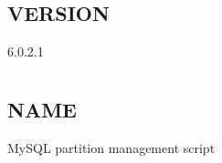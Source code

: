 \documentclass[letterpaper,10pt,english]{sphinxmanual}
\begin{document}
\section{VERSION}
\label{\detokenize{mariadb-kill:version}}
 6.0.2.1


\chapter{}
\label{\detokenize{mariadb-parted:mariadb-parted}}\label{\detokenize{mariadb-parted::doc}}

\section{NAME}
\label{\detokenize{mariadb-parted:name}}
 \sphinxhyphen{} MySQL partition management script
\end{document}
